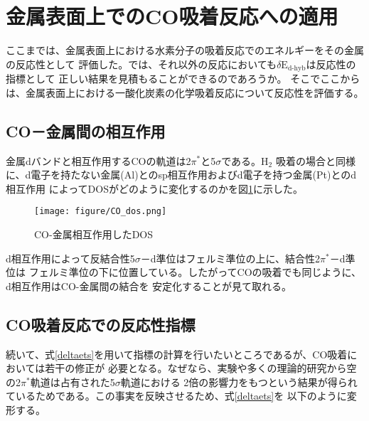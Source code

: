 \documentclass[12pt]{ltjsarticle}
\begin{document}
\section{金属表面上でのCO吸着反応への適用}

ここまでは、金属表面上における水素分子の吸着反応でのエネルギーをその金属の反応性として
評価した。では、それ以外の反応においても$\delta \text{E}_\text{d-hyb}$は反応性の指標として
正しい結果を見積もることができるのであろうか。
そこでここからは、金属表面上における一酸化炭素の化学吸着反応について反応性を評価する。

\subsection{CO－金属間の相互作用}
金属dバンドと相互作用するCOの軌道は2$\pi^*$と5$\sigma$である。$\text{H}_\text{2}$
吸着の場合と同様に、d電子を持たない金属(Al)とのsp相互作用およびd電子を持つ金属(Pt)とのd相互作用
によってDOSがどのように変化するのかを図\ref{fig:codos}に示した。\cite{Hammer1996}

\begin{figure}[hbtp]
    \begin{center}
     \texttt{[image: figure/CO\_dos.png]}
    \end{center}
    \caption{CO-金属相互作用したDOS}
    \label{fig:codos}
\end{figure}

d相互作用によって反結合性5$\sigma$－d準位はフェルミ準位の上に、結合性2$\pi^*$－d準位は
フェルミ準位の下に位置している。したがってCOの吸着でも同じように、d相互作用はCO-金属間の結合を
安定化することが見て取れる。

\subsection{CO吸着反応での反応性指標}
続いて、式\ref{deltaets}を用いて指標の計算を行いたいところであるが、CO吸着においては若干の修正が
必要となる。なぜなら、実験や多くの理論的研究から空の2$\pi^*$軌道は占有された5$\sigma$軌道における
2倍の影響力をもつという結果が得られているためである。この事実を反映させるため、式\ref{deltaets}を
以下のように変形する。
\end{document}
